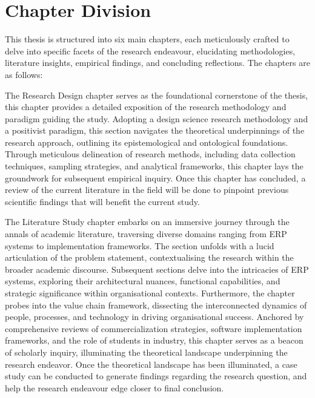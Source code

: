 \section{Chapter Division}
\par{This thesis is structured into six main chapters, each meticulously crafted to delve into specific
facets of the research endeavour, elucidating methodologies, literature insights, empirical findings, and 
concluding reflections. The chapters are as follows:}
\par{The Research Design chapter serves as the foundational cornerstone of the thesis, this chapter
provides a detailed exposition of the research methodology and paradigm guiding the study. Adopting a design science 
research methodology and a positivist paradigm, this section navigates the theoretical underpinnings of the research 
approach, outlining its epistemological and ontological foundations. Through meticulous delineation of research
methods, including data collection techniques, sampling strategies, and analytical frameworks, this chapter lays the 
groundwork for subsequent empirical inquiry. Once this chapter has concluded, a review of the current literature in the 
field will be done to pinpoint previous scientific findings that will benefit the current study.}
\par{The Literature Study chapter embarks on an immersive journey through the annals of academic literature, traversing 
diverse domains ranging from ERP systems to implementation frameworks. The section unfolds with a lucid articulation of 
the problem statement, contextualising the research within the broader academic discourse. Subsequent sections delve into 
the intricacies of ERP systems, exploring their architectural nuances, functional capabilities, and strategic significance 
within organisational contexts. Furthermore, the chapter probes into the value chain framework, dissecting the 
interconnected dynamics of people, processes, and technology in driving organisational success. Anchored by 
comprehensive reviews of commercialization strategies, software implementation frameworks, and the role of students in 
industry, this chapter serves as a beacon of scholarly inquiry, illuminating the theoretical landscape underpinning the 
research endeavor. Once the theoretical landscape has been illuminated, a case study can be conducted to generate findings 
regarding the research question, and help the research endeavour edge closer to final conclusion.}
